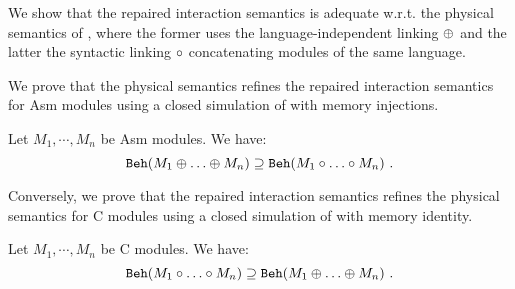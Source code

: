 
We show that the repaired interaction semantics is adequate w.r.t. the physical semantics of \cc{},
where the former uses the language-independent linking $\oplus$ and the latter the syntactic linking $\circ$
concatenating modules of the same language.

We prove that the physical semantics refines the repaired interaction semantics for \textrm{Asm} modules
using a closed simulation of \cc{} with memory injections.
\begin{theorem}\label{thm:results-adequacy-asm}
  Let $M_1, \cdots, M_n$ be \textrm{Asm} modules.  We have:
  \[   \mathtt{Beh}({M_1 \oplus \ldots \oplus M_n}) \supseteq  \mathtt{Beh}({M_1 \circ \ldots \circ M_n}) ~.\]
\end{theorem}
\noindent
{}




Conversely, we prove that the repaired interaction semantics refines the physical semantics for \textrm{\cc{} C} modules
using a closed simulation of \cc{} with memory identity.
\begin{theorem}[Adequacy w.r.t C]\label{thm:results-adequacy-c}
  Let $M_1, \cdots, M_n$ be \textrm{\cc{} C} modules.  We have:
  \[  \mathtt{Beh}({M_1 \circ \ldots \circ M_n}) \supseteq \mathtt{Beh}({M_1 \oplus \ldots \oplus M_n})  ~.\]
\end{theorem}

